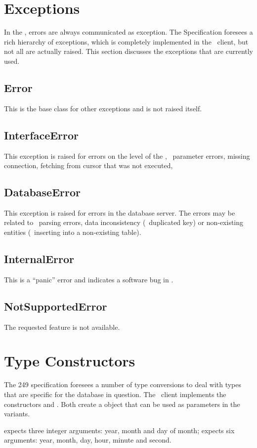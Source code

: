 \section{Exceptions}
In the , errors are  always
communicated as exception. The Specification
foresees a rich hierarchy of exceptions, which
is completely implemented in the \nowdb\ client,
but not all are actually raised. This section
discusses the exceptions that are currently used.

\subsection{Error}
This is the base class for other exceptions
and is not raised itself.

\subsection{InterfaceError}
This exception is raised for errors on the level
of the , \eg\ parameter errors, missing
connection, fetching from cursor that was not executed, \etc\

\subsection{DatabaseError}
This exception is raised for errors in the database server.
The errors may be related to \sql\ parsing errors,
data inconsistency (\eg\ duplicated key) or non-existing
entities (\eg\ inserting into a non-existing table).

\subsection{InternalError}
This is a ``panic'' error and indicates a software bug in \nowdb.

\subsection{NotSupportedError}
The requested feature is not available.

\section{Type Constructors}
The  249 specification foresees a number
of type conversions to deal with types that are specific
for the database in question.
The \nowdb\ client implements the constructors
 and .
Both create a   object that can be used
as parameters in the  variants.

 expects three integer arguments:
year, month and day of month;
 expects six arguments:
year, month, day, hour, minute and second.
